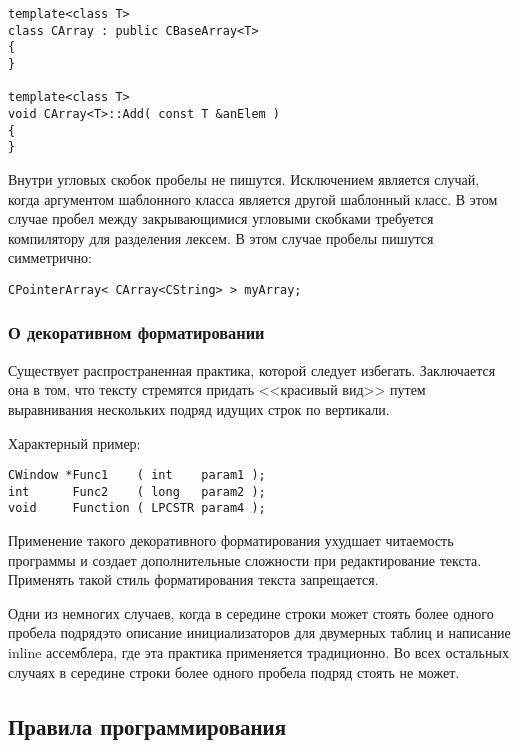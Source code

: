 {{{\begin{lstlisting}[frame=single]
template<class T>
class СArray : public СBaseArray<T>
{
}

template<class T>
void СArray<T>::Add( const T &anElem )
{
}
\end{lstlisting}

Внутри угловых скобок пробелы не пишутся. Исключением является случай, когда аргументом шаблонного класса является другой шаблонный класс. В этом случае пробел между закрывающимися угловыми скобками требуется компилятору для разделения лексем. В этом случае пробелы пишутся симметрично:

\begin{lstlisting}[frame=single,numbers=none]
CPointerArray< CArray<CString> > myArray;
\end{lstlisting}

\subsubsection{О декоративном форматировании}

Существует распространенная практика, которой следует избегать. Заключается она в том, что тексту стремятся придать <<красивый вид>> путем выравнивания нескольких подряд идущих строк по вертикали. 

Характерный пример:

\begin{lstlisting}[frame=single]
СWindow *Func1    ( int    param1 );
int      Func2    ( long   param2 );
void     Function ( LPCSTR param4 );
\end{lstlisting}

Применение такого декоративного форматирования ухудшает читаемость программы и создает дополнительные сложности при редактирование текста. Применять такой стиль форматирования текста запрещается.

Одни из немногих случаев, когда в середине строки может стоять более одного пробела подряд\mdash это описание инициализаторов для двумерных таблиц и написание inline ассемблера, где эта практика применяется традиционно. Во всех остальных случаях в середине строки более одного пробела подряд стоять не может.

\newpage
\subsection{Правила программирования}

}}}
